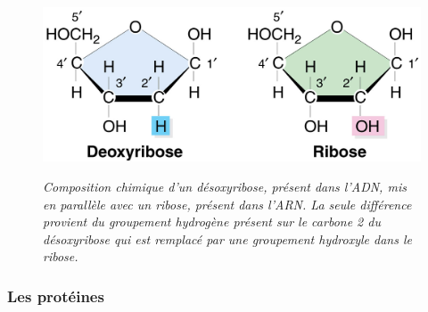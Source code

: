 \begin{figure}
  \centering
  {\includegraphics[width=0.8\linewidth]{./figures/ch1/deoxyribose_vs_ribose}}
    \caption{\it Composition chimique d'un désoxyribose, présent dans l'ADN, mis en parallèle avec un ribose, présent dans l'ARN. La seule différence provient du groupement hydrogène présent sur le carbone 2 du désoxyribose qui est remplacé par une groupement hydroxyle dans le ribose.}
    \label{Fig:deoxyribose_vs_ribose}
  \hspace{0.3cm}
\end{figure}



\subsubsection{Les protéines}


